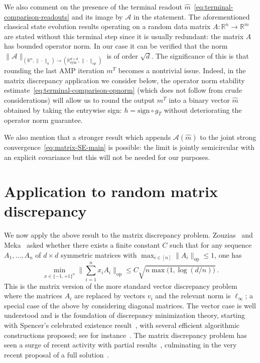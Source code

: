 \documentclass[11pt]{article}
\theoremstyle{definition}
\theoremstyle{remark}
\numberwithin{equation}{section}
\numberwithin{theorem}{section}
\newcommand{\R}{\mathbb R}
\newcommand{\op}{\mathrm{op}}
\newcommand{\cA}{\mathcal A}
\newcommand{\Symm}{\mathbb{R}^{d \times d}_{\mathrm{sym}}}
\begin{document}
 We also comment on the presence of the terminal readout $\widehat m$~\eqref{eq:terminal-comparison-readouts} and its image by $\cA$ in the statement. The aforementioned classical state evolution results operating on a random data matrix $A: \R^n \to \R^m$ are stated without this terminal step since it is usually redundant: the matrix $A$ has bounded operator norm. In our case it can be verified that the norm $\|\cA\|_{(\R^n,\|\cdot\|_n)\to(\Symm,\|\cdot\|_{\op})}$ is of order $\sqrt d$. The significance of this is that rounding the last AMP iteration $m^T$ becomes a nontrivial issue. Indeed, in the matrix discrepancy application we consider below, the operator norm stability estimate~\eqref{eq:terminal-comparison-opnorm} (which does not follow from crude considerations) will allow us to round the output $m^T$ into a binary vector $\widehat m$ obtained by taking the entrywise sign: $h = \mathrm{sign} \circ g_T$ without deteriorating the operator norm guarantee. 
 
 We also mention that a stronger result which appends $\cA(\widehat m)$ to the joint strong convergence~\eqref{eq:matrix-SE-main} is possible: the limit is jointly semicircular with an explicit covariance but this will not be needed for our purposes.




\section{Application to random matrix discrepancy} 
\label{sec:matrix-discrepancy}
We now apply the above result to the matrix discrepancy problem.
Zouzias~\cite{zouzias2012matrix} and Meka~\cite{meka2014blog} asked whether there exists a finite constant $C$ such that for any sequence  $A_1,\ldots,A_n$ of $d \times d$ symmetric matrices with $\max_{i\in [n]} \|A_i\|_{\op}\le 1$, one has
\[\min_{x \in \{-1,+1\}^n}\Big\|\sum_{i=1}^n x_i A_i\Big\|_{\op} \le C \sqrt{n\max\bigl(1,\log(d/n)\bigr)}\,.\]
This is the matrix version of the more standard vector discrepancy problem where the matrices $A_i$ are replaced by vectors $v_i$ and the relevant norm is $\ell_\infty$; a special case of the above by considering diagonal matrices. The vector case is well understood and is the foundation of discrepancy minimization theory, starting with Spencer's celebrated existence result~\cite{spencer1985six}, with several efficient algorithmic constructions proposed; see for instance~\cite{bansal2013deterministic,lovett2015constructive,levy2017deterministic}. 
%
The matrix discrepancy problem has seen a surge of recent activity with partial results~\cite{dadush2022new,hopkins2022matrix,bansal2023resolving,bandeira2026matrix,akbas2026algebraic}, culminating in the very recent proposal of a full solution~\cite{akbas2026algebraic}. 
\end{document}
